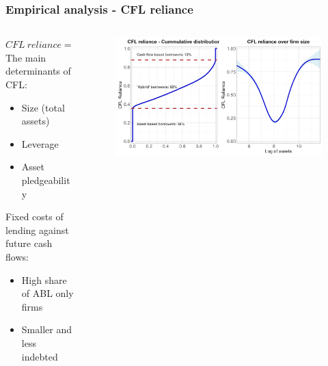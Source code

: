 \documentclass[notes]{beamer}
\begin{document}
\begin{frame}
  \frametitle{Empirical analysis - CFL reliance}

  \begin{columns}
    \begin{column}{0.55\textwidth} %
    
    $ CFL \ reliance = CFL \ debt / Total \  debt $ \vspace{1mm} \\

    The main determinants of CFL: 
    \begin{itemize}
     \setlength\itemsep{0em}
        \item Size (total assets)
        \item Leverage
        \item Asset pledgeability
    \end{itemize}
    Fixed costs of lending against future cash flows: 
    \begin{itemize}
        \setlength\itemsep{0em}
        \item High share of ABL only firms
        \item Smaller and less indebted
    \end{itemize}
    
 \end{column}
 \begin{column}{0.45\textwidth} %
     \begin{figure}
        \includegraphics[width=\textwidth]{presentations/smoothcfd.png} %
      \end{figure}
    \end{column}
  \end{columns}
\end{frame}
\end{document}
